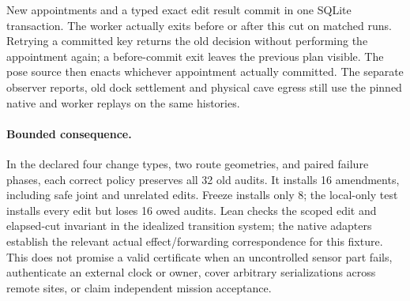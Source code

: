 \documentclass{article}
\begin{document}
New appointments and a typed exact edit result commit in
one SQLite transaction. The worker actually exits before or
after this cut on matched runs. Retrying a committed key
returns the old decision without performing the appointment
again; a before-commit exit leaves the previous plan visible.
The pose source then enacts whichever appointment actually
committed. The separate observer reports, old dock settlement
and physical cave egress still use the pinned native and
worker replays on the same histories.

\paragraph{Bounded consequence.}
In the declared four change types, two route geometries, and
paired failure phases, each correct policy preserves all 32
old audits. It installs 16 amendments, including safe joint
and unrelated edits. Freeze installs only 8; the local-only
test installs every edit but loses 16 owed audits. Lean checks
the scoped edit and elapsed-cut invariant in the idealized
transition system; the native adapters establish the relevant
actual effect/forwarding correspondence for this fixture.
This does not promise a valid certificate when an
uncontrolled sensor part fails, authenticate an external
clock or owner, cover arbitrary serializations across remote
sites, or claim independent mission acceptance.
\end{document}
